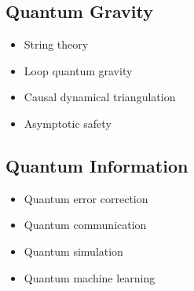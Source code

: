\documentclass[11pt]{article}
\theoremstyle{definition}
\begin{document}
\subsection{Quantum Gravity}
\begin{itemize}
    \item String theory
    \item Loop quantum gravity
    \item Causal dynamical triangulation
    \item Asymptotic safety
\end{itemize}

\subsection{Quantum Information}
\begin{itemize}
    \item Quantum error correction
    \item Quantum communication
    \item Quantum simulation
    \item Quantum machine learning
\end{itemize}
\end{document}
